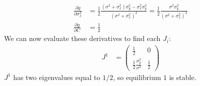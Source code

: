 \documentclass{article}
\begin{document}
\begin{enumerate}
\begin{align*}
\\ \frac{\partial g}{\partial \sigma_x^2}&=\frac{1}{2}\frac{(\sigma^2+\sigma_x^2)\sigma_y^2-\sigma_x^2\sigma_y^2}{(\sigma^2+\sigma_x^2)^2}=\frac{1}{2}\frac{\sigma^2\sigma_y^2}{(\sigma^2+\sigma_x^2)^2}
\\ \frac{\partial g}{\partial C}&=\frac{1}{2}
\end{align*}
We can now evaluate these derivatives to find each $J_i$:
\begin{align*}
J^1&=\left(\begin{array}{cc}\frac{1}{2} & 0 \\ \frac{1}{2}\frac{\sigma_y^2}{\sigma^2} & \frac{1}{2} \end{array}\right)
\end{align*}
$J^1$ has two eigenvalues equal to $1/2$, so equilibrium $1$ is stable. 



\end{enumerate}
\end{document}
